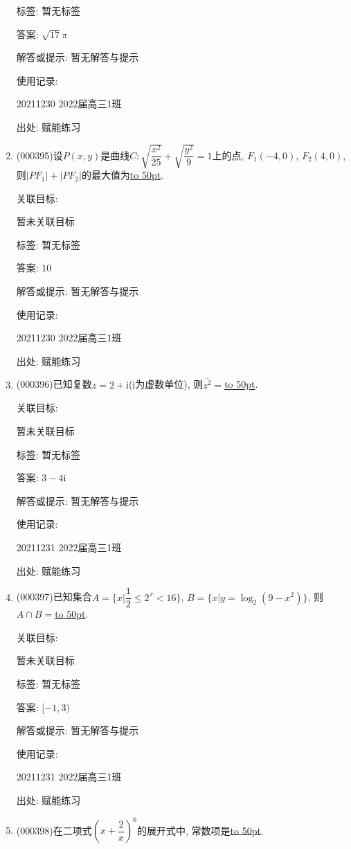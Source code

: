 \documentclass[10pt,a4paper]{article}
\newcommand{\blank}[1]{\underline{\hbox to #1pt{}}}
\begin{document}
\begin{enumerate}[1.]
标签: 暂无标签

答案: $\sqrt{17}\pi$

解答或提示: 暂无解答与提示

使用记录:

20211230	2022届高三1班	


出处: 赋能练习
\item { (000395)}设$P(x,y)$是曲线$C:\sqrt{\dfrac{x^2}{25}}+\sqrt{\dfrac{y^2}9}=1$上的点, $F_1(-4,0)$, $F_2(4,0)$, 则$|PF_1|+|PF_2|$的最大值为\blank{50}.


关联目标:

暂未关联目标



标签: 暂无标签

答案: $10$

解答或提示: 暂无解答与提示

使用记录:

20211230	2022届高三1班	


出处: 赋能练习
\item { (000396)}已知复数$z=2+\mathrm{i}$($\mathrm{i}$为虚数单位), 则$\overline{{z^2}}=$\blank{50}.


关联目标:

暂未关联目标



标签: 暂无标签

答案: $3-4\mathrm{i}$

解答或提示: 暂无解答与提示

使用记录:

20211231	2022届高三1班	


出处: 赋能练习
\item { (000397)}已知集合$A=\{x|\dfrac12\le {2^x}<16\}$, $B=\{x|y=\log _2(9-x^2)\}$, 则$A\cap B=$\blank{50}.


关联目标:

暂未关联目标



标签: 暂无标签

答案: $[-1,3)$

解答或提示: 暂无解答与提示

使用记录:

20211231	2022届高三1班	


出处: 赋能练习
\item { (000398)}在二项式$(x+\dfrac2x)^6$的展开式中, 常数项是\blank{50}.



\end{enumerate}
\end{document}
